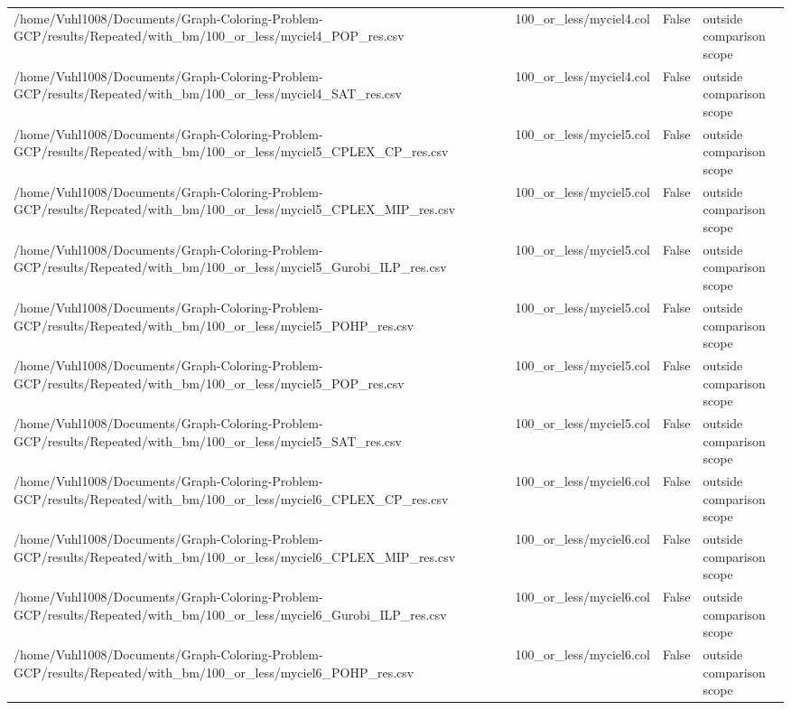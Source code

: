 \begin{table}[htbp]
\begin{tabular}{llll}
/home/Vuhl1008/Documents/Graph-Coloring-Problem-GCP/results/Repeated/with\_bm/100\_or\_less/myciel4\_POP\_res.csv & 100\_or\_less/myciel4.col & False & outside comparison scope \\
/home/Vuhl1008/Documents/Graph-Coloring-Problem-GCP/results/Repeated/with\_bm/100\_or\_less/myciel4\_SAT\_res.csv & 100\_or\_less/myciel4.col & False & outside comparison scope \\
/home/Vuhl1008/Documents/Graph-Coloring-Problem-GCP/results/Repeated/with\_bm/100\_or\_less/myciel5\_CPLEX\_CP\_res.csv & 100\_or\_less/myciel5.col & False & outside comparison scope \\
/home/Vuhl1008/Documents/Graph-Coloring-Problem-GCP/results/Repeated/with\_bm/100\_or\_less/myciel5\_CPLEX\_MIP\_res.csv & 100\_or\_less/myciel5.col & False & outside comparison scope \\
/home/Vuhl1008/Documents/Graph-Coloring-Problem-GCP/results/Repeated/with\_bm/100\_or\_less/myciel5\_Gurobi\_ILP\_res.csv & 100\_or\_less/myciel5.col & False & outside comparison scope \\
/home/Vuhl1008/Documents/Graph-Coloring-Problem-GCP/results/Repeated/with\_bm/100\_or\_less/myciel5\_POHP\_res.csv & 100\_or\_less/myciel5.col & False & outside comparison scope \\
/home/Vuhl1008/Documents/Graph-Coloring-Problem-GCP/results/Repeated/with\_bm/100\_or\_less/myciel5\_POP\_res.csv & 100\_or\_less/myciel5.col & False & outside comparison scope \\
/home/Vuhl1008/Documents/Graph-Coloring-Problem-GCP/results/Repeated/with\_bm/100\_or\_less/myciel5\_SAT\_res.csv & 100\_or\_less/myciel5.col & False & outside comparison scope \\
/home/Vuhl1008/Documents/Graph-Coloring-Problem-GCP/results/Repeated/with\_bm/100\_or\_less/myciel6\_CPLEX\_CP\_res.csv & 100\_or\_less/myciel6.col & False & outside comparison scope \\
/home/Vuhl1008/Documents/Graph-Coloring-Problem-GCP/results/Repeated/with\_bm/100\_or\_less/myciel6\_CPLEX\_MIP\_res.csv & 100\_or\_less/myciel6.col & False & outside comparison scope \\
/home/Vuhl1008/Documents/Graph-Coloring-Problem-GCP/results/Repeated/with\_bm/100\_or\_less/myciel6\_Gurobi\_ILP\_res.csv & 100\_or\_less/myciel6.col & False & outside comparison scope \\
/home/Vuhl1008/Documents/Graph-Coloring-Problem-GCP/results/Repeated/with\_bm/100\_or\_less/myciel6\_POHP\_res.csv & 100\_or\_less/myciel6.col & False & outside comparison scope \\

\end{tabular}
\end{table}
